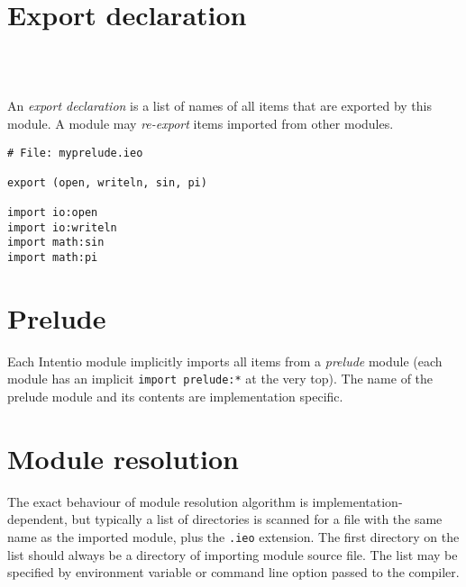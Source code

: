 \section{Export declaration}

\begin{bnf}
   \eq {} \ \term{(} \  \ \term{)} \\
   \eq {} \  \ \gtry{\term{,}}
\end{bnf}

An \emph{export declaration} is a list of names of all items that are exported by this module. A module may \emph{re-export} items imported from other modules.

\begin{example}[Re-exporting]
\begin{lstlisting}
# File: myprelude.ieo

export (open, writeln, sin, pi)

import io:open
import io:writeln
import math:sin
import math:pi
\end{lstlisting}
\end{example}

\section{Prelude}

Each Intentio module implicitly imports all items from a \emph{prelude} module (each module has an implicit \lstinline{import prelude:*} at the very top). The name of the prelude module and its contents are implementation specific.

\section{Module resolution}

The exact behaviour of module resolution algorithm is implementation-dependent, but typically a list of directories is scanned for a file with the same name as the imported module, plus the \lstinline{.ieo} extension. The first directory on the list should always be a directory of importing module source file. The list may be specified by environment variable or command line option passed to the compiler.
